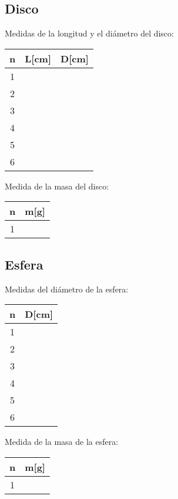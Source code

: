 \documentclass[letter,twoside,11pt]{article}
\begin{document}
\subsection{Disco}
Medidas de la longitud y el diámetro del disco:
\begin{center}
\begin{tabular}{|c|>{\centering}m{3.0cm}<{\centering}
                  |>{\centering}m{3.0cm}<{\centering}|}
\hline
\textbf{n} & \textbf{L[cm]} & \textbf{D[cm]} \tabularnewline \hline
1 & & \\ \hline
2 & & \\ \hline
3 & & \\ \hline
4 & & \\ \hline
5 & & \\ \hline
6 & & \\
\hline
\end{tabular}
\end{center}
\vspace{0.5cm}
Medida de la masa del disco:
\begin{center}
\begin{tabular}{|c|>{\centering}m{3.0cm}<{\centering}|}
\hline
\textbf{n} & \textbf{m[g]} \tabularnewline \hline
1 & \\
\hline
\end{tabular}
\end{center}

\subsection{Esfera}
Medidas del diámetro de la esfera:
\begin{center}
\begin{tabular}{|c|>{\centering}m{3.0cm}<{\centering}|}
\hline
\textbf{n} & \textbf{D[cm]} \tabularnewline \hline
1 & \\ \hline
2 & \\ \hline
3 & \\ \hline
4 & \\ \hline
5 & \\ \hline
6 & \\ \hline
\end{tabular}
\end{center}
\vspace{0.5cm}
Medida de la masa de la esfera:
\begin{center}
\begin{tabular}{|c|>{\centering}m{3.0cm}<{\centering}|}
\hline
\textbf{n} & \textbf{m[g]} \tabularnewline \hline
1 & \\
\hline
\end{tabular}
\end{center}
\end{document}
